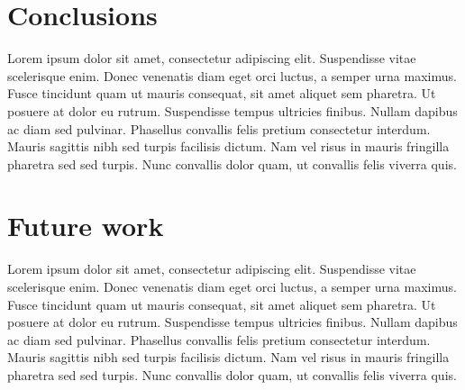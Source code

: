 \documentclass{sig-alternate}
\begin{document}

\section{Conclusions}
Lorem ipsum dolor sit amet, consectetur adipiscing elit. Suspendisse vitae scelerisque enim. Donec venenatis diam eget orci luctus, a semper urna maximus. Fusce tincidunt quam ut mauris consequat, sit amet aliquet sem pharetra. Ut posuere at dolor eu rutrum. Suspendisse tempus ultricies finibus. Nullam dapibus ac diam sed pulvinar. Phasellus convallis felis pretium consectetur interdum. Mauris sagittis nibh sed turpis facilisis dictum. Nam vel risus in mauris fringilla pharetra sed sed turpis. Nunc convallis dolor quam, ut convallis felis viverra quis.


\section{Future work}
Lorem ipsum dolor sit amet, consectetur adipiscing elit. Suspendisse vitae scelerisque enim. Donec venenatis diam eget orci luctus, a semper urna maximus. Fusce tincidunt quam ut mauris consequat, sit amet aliquet sem pharetra. Ut posuere at dolor eu rutrum. Suspendisse tempus ultricies finibus. Nullam dapibus ac diam sed pulvinar. Phasellus convallis felis pretium consectetur interdum. Mauris sagittis nibh sed turpis facilisis dictum. Nam vel risus in mauris fringilla pharetra sed sed turpis. Nunc convallis dolor quam, ut convallis felis viverra quis.




\end{document}
